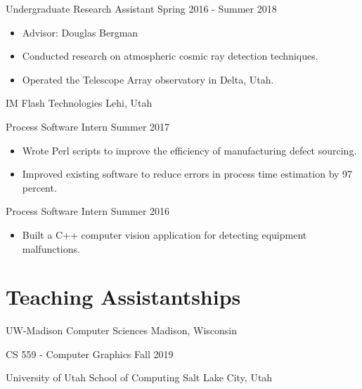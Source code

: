 \begin{tab2} Undergraduate Research Assistant \> Spring 2016 - Summer 2018 \end{tab2}
\begin{itemize}
    \item Advisor: Douglas Bergman
    \item Conducted research on atmospheric cosmic ray detection techniques.
    \item Operated the Telescope Array observatory in Delta, Utah.
\end{itemize}

\blockskip

\begin{tab1} IM Flash Technologies \> Lehi, Utah \end{tab1}

\begin{tab2} Process Software Intern \> Summer 2017 \end{tab2}
\begin{itemize}
    \item Wrote Perl scripts to improve the efficiency of manufacturing defect sourcing.
    \item Improved existing software to reduce errors in process time estimation by 97 percent.
\end{itemize}

\begin{tab2} Process Software Intern \> Summer 2016 \end{tab2}
\begin{itemize}
    \item Built a C++ computer vision application for detecting equipment malfunctions.
\end{itemize}

\section*{Teaching Assistantships}

\begin{tab1} UW-Madison Computer Sciences \> Madison, Wisconsin \end{tab1}

\begin{tab2} CS 559 - Computer Graphics \> Fall 2019 \end{tab2}

\blockskip

\begin{tab1} University of Utah School of Computing \> Salt Lake City, Utah \end{tab1}

